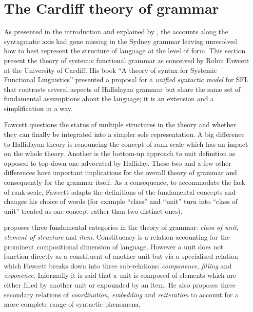 \section{The Cardiff theory of grammar}
\label{sec:cardiff-theory-grammar}
As presented in the introduction and explained by \citet{Bateman2008}, the accounts along the syntagmatic axis had gone missing in the Sydney grammar leaving unresolved how to best represent the structure of language at the level of form. This section present the theory of systemic functional grammar as conceived by Robin Fawcett at the University of Cardiff. His book ``A theory of syntax for Systemic Functional Linguistics'' \citep{Fawcett2000} presented a proposal for a \textit{unified syntactic model} for SFL that contrasts several aspects of Hallidayan grammar but share the same set of fundamental assumptions about the language; it is an extension and a simplification in a way.

Fawcett questions the status of multiple structures in the theory and whether they can finally be integrated into a simpler sole representation. A big difference to Hallidayan theory is renouncing the concept of rank scale which has an impact on the whole theory. Another is the bottom-up approach to unit definition as opposed to top-down one advocated by Halliday. These two and a few other differences have important implications for the overall theory of grammar and consequently for the grammar itself. As a consequence, to accommodate the lack of rank-scale, Fawcett adapts the definitions of the fundamental concepts and changes his choice of words (for example ``class'' and ``unit'' turn into ``class of unit'' treated as one concept rather than two distinct ones).

\citet{Fawcett2000} proposes three fundamental categories in the theory of grammar: \textit{class of unit}, \textit{element of structure} and \textit{item}. Constituency is a relation accounting for the prominent compositional dimension of language. However a unit does not function directly as a constituent of another unit but via a specialised relation which Fawcett breaks down into three sub-relations: \textit{componence}, \textit{filling} and \textit{exponence}. Informally it is said that a unit is composed of elements which are either filled by another unit or expounded by an item. He also proposes three secondary relations of \textit{coordination}, \textit{embedding} and \textit{reiteration} to account for a more complete range of syntactic phenomena.


